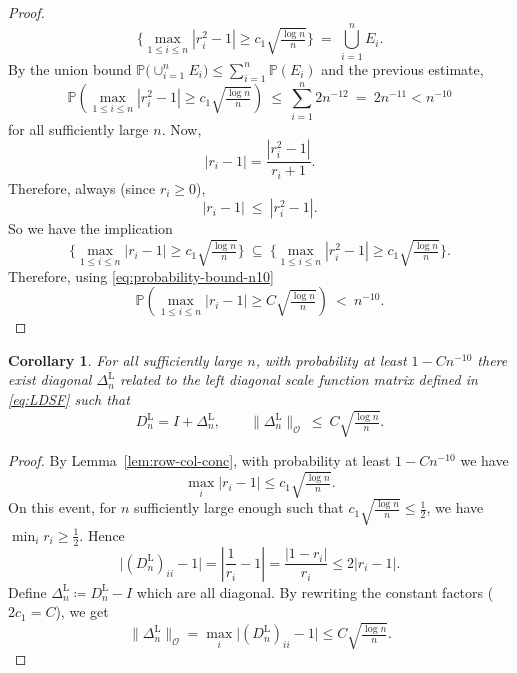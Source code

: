 \documentclass[11pt,a4paper]{article}
\newtheorem{corollary}[theorem]{Corollary}
\newcommand{\be}{\begin{equation}}
\newcommand{\ee}{\end{equation}}
\newcommand{\op}{\mathcal{O}}
\newcommand{\Prob}{\mathbb{P}}
\begin{document}
\begin{proof}
\begin{equation}
\Big\{\max_{1\le i\le n}|r_i^2-1|\geq c_1\sqrt{\tfrac{\log n}{n}}\Big\}
\ =\ \bigcup_{i=1}^n E_i.
\end{equation}
By the union bound $\Prob\big(\cup_{i=1}^n E_i\big)\le\sum_{i=1}^n \Prob(E_i)$ and the previous estimate,
\begin{equation}\label{eq:probability-bound-n10}
\Prob\!\left(\max_{1\le i\le n}|r_i^2-1|\geq c_1\sqrt{\tfrac{\log n}{n}}\right)
\ \le\ \sum_{i=1}^n 2n^{-12}
\ =\ 2n^{-11} < n^{-10}
\end{equation}
for all sufficiently large $n$. Now, 
\begin{equation}
|r_i-1|=\frac{|r_i^2-1|}{\,r_i+1\,}.
\end{equation}
Therefore, {always} (since $r_i\ge 0$),
\begin{equation}
|r_i-1|\ \le\ |r_i^2-1|.
\label{eq:basic-sqrt-ineq}
\end{equation}
So we have the implication
\begin{equation}
\Big\{\max_{1\le i\le n}|r_i-1|\geq c_1\sqrt{\tfrac{\log n}{n}}\Big\}
\ \subseteq\
\Big\{\max_{1\le i\le n}|r_i^2-1|\geq c_1\sqrt{\tfrac{\log n}{n}}\Big\}.
\end{equation}
Therefore, using \cref{eq:probability-bound-n10}
\begin{equation}\label{eq:b.28ref}
\Prob\!\left(\max_{1\le i\le n}|r_i-1|\geq C\sqrt{\tfrac{\log n}{n}}\right)
\ <\ n^{-10}.
\end{equation}
\end{proof}
\begin{corollary}\label{cor:DL-DR-expansion}
For all sufficiently large $n$, with probability at least $1-Cn^{-10}$ there exist diagonal $\Delta^\mathrm{L}_{n}$ related to the left diagonal scale function matrix defined in \cref{eq:LDSF} such that
\begin{equation}
D^\mathrm{L}_{n}=I+\Delta^\mathrm{L}_{n},\qquad
\|\Delta^\mathrm{L}_{n}\|_{\op}\ \le\ C\sqrt{\tfrac{\log n}{n}}.
\end{equation}
\end{corollary}
\begin{proof}
By Lemma~\ref{lem:row-col-conc}, with probability at least $1-Cn^{-10}$ we have
\be
\max_i |r_i-1|\le c_1\sqrt{\tfrac{\log n}{n}}.
\ee
On this event, for $n$ sufficiently large enough such that $c_1\sqrt{\frac{\log n}{n}}\le \tfrac12$, we have $\min_i r_i\ge \tfrac12$. Hence
\be
\big|(D^\mathrm{L}_{n})_{ii}-1\big|=\left|\frac{1}{r_i}-1\right|=\frac{|1-r_i|}{r_i}\le 2|r_i-1|.
\ee
Define $\Delta^\mathrm{L}_{n}\coloneq D^\mathrm{L}_{n}-I$ which are all diagonal. By rewriting the constant factors ($2c_1=C$), we get
\be
\|\Delta^\mathrm{L}_{n}\|_{\op}=\max_i\big|(D^\mathrm{L}_{n})_{ii}-1\big|\le C\sqrt{\tfrac{\log n}{n}}.
\ee
\end{proof}
\end{document}
